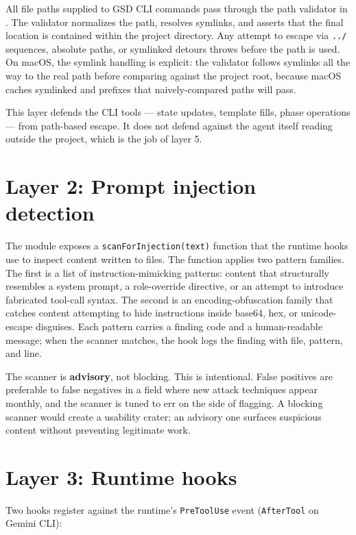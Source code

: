 \documentclass[11pt,letterpaper,openany]{book}
\begin{document}
All file paths supplied to GSD CLI commands pass through the path validator in . The validator normalizes the path, resolves symlinks, and asserts that the final location is contained within the project directory. Any attempt to escape via \texttt{../} sequences, absolute paths, or symlinked detours throws before the path is used. On macOS, the symlink handling is explicit: the validator follows symlinks all the way to the real path before comparing against the project root, because macOS caches symlinked  and  prefixes that naively-compared paths will pass.

This layer defends the CLI tools — state updates, template fills, phase operations — from path-based escape. It does not defend against the agent itself reading outside the project, which is the job of layer 5.

\section{Layer 2: Prompt injection detection}

The  module exposes a \texttt{scanForInjection(text)} function that the runtime hooks use to inspect content written to  files. The function applies two pattern families. The first is a list of instruction-mimicking patterns: content that structurally resembles a system prompt, a role-override directive, or an attempt to introduce fabricated tool-call syntax. The second is an encoding-obfuscation family that catches content attempting to hide instructions inside base64, hex, or unicode-escape disguises. Each pattern carries a finding code and a human-readable message; when the scanner matches, the hook logs the finding with file, pattern, and line.

The scanner is \textbf{advisory}, not blocking. This is intentional. False positives are preferable to false negatives in a field where new attack techniques appear monthly, and the scanner is tuned to err on the side of flagging. A blocking scanner would create a usability crater; an advisory one surfaces suspicious content without preventing legitimate work.

\section{Layer 3: Runtime hooks}

Two hooks register against the runtime's \texttt{PreToolUse} event (\texttt{AfterTool} on Gemini CLI):
\end{document}
